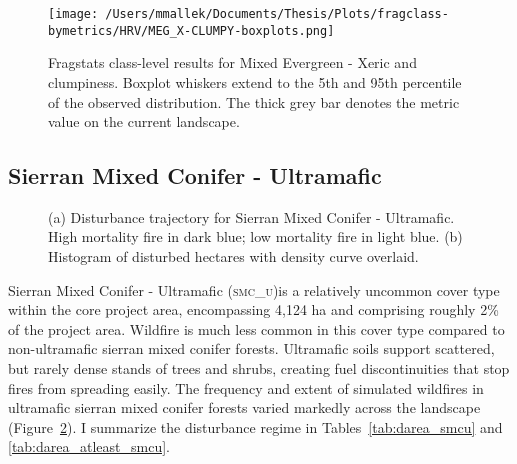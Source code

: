 \begin{figure}[!htbp]
\centering
    \texttt{[image: /Users/mmallek/Documents/Thesis/Plots/fragclass-bymetrics/HRV/MEG\_X-CLUMPY-boxplots.png]}
  \caption{Fragstats class-level results for Mixed Evergreen - Xeric and clumpiness. Boxplot whiskers extend to the 5th and 95th percentile of the observed distribution. The thick grey bar denotes the metric value on the current landscape.}
  \label{fig:megx_clumpy}
\end{figure}


\clearpage
\subsection{Sierran Mixed Conifer - Ultramafic} 
\begin{figure}[!htbp]
  \centering
  \caption{\small (a) Disturbance trajectory for Sierran Mixed Conifer - Ultramafic. High mortality fire in dark blue; low mortality fire in light blue. (b) Histogram of disturbed hectares with density curve overlaid.} 
  \label{fig:darea_smcu}
\end{figure}

Sierran Mixed Conifer - Ultramafic (\textsc{smc\_u})is a relatively uncommon cover type within the core project area, encompassing 4,124 ha and comprising roughly 2\% of the project area. Wildfire is much less common in this cover type compared to non-ultramafic sierran mixed conifer forests. Ultramafic soils support scattered, but rarely dense stands of trees and shrubs, creating fuel discontinuities that stop fires from spreading easily. The frequency and extent of simulated wildfires in ultramafic sierran mixed conifer forests varied markedly across the landscape (Figure~\ref{fig:darea_smcu}).  I summarize the disturbance regime in Tables~\ref{tab:darea_smcu} and \ref{tab:darea_atleast_smcu}.

